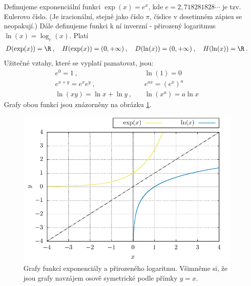 \begin{example}
    Definujeme exponenciální funkci $\exp(x) = e^x$, kde $e = 2,718281828\cdots$ je tzv. Eulerovo číslo. (Je iracionální, stejně jako číslo $\pi$, číslice v desetinném zápisu se neopakují.) Dále definujeme funkci k ní inverzní - přirozený logaritmus $\ln(x) = \log_e (x)$. 
    Platí \begin{align}
        D(\exp(x)) = \R \:,\quad H(\exp(x)) = (0,+\infty) \:,\quad  D(\ln(x)) = (0,+\infty) \:,\quad  H(\ln(x)) = \R \:.
    \end{align}
    Užitečné vztahy, které se vyplatí pamatovat, jsou: \begin{align}
        e^0 = 1 \:,&\quad \ln(1) =0 \\
        e^{x+y} = e^x e^y \:,& \quad e^{ax} = (e^x)^a\\
        \ln(xy) = \ln x + \ln y \:,& \quad \ln(x^a) = a \ln x 
    \end{align}
    Grafy obou funkcí jsou znázorněny na obrázku \ref{fig:exp-log}.

    \begin{figure}[H]
        \centering
        \includegraphics{Gnuplot/cv1/Figures/exp-log.pdf}
        \caption{Grafy funkcí exponenciály a přirozeného logaritmu. Všimněme si, že jsou grafy navzájem osově symetrické podle přímky $y=x$.}
        \label{fig:exp-log}
    \end{figure}

\end{example}